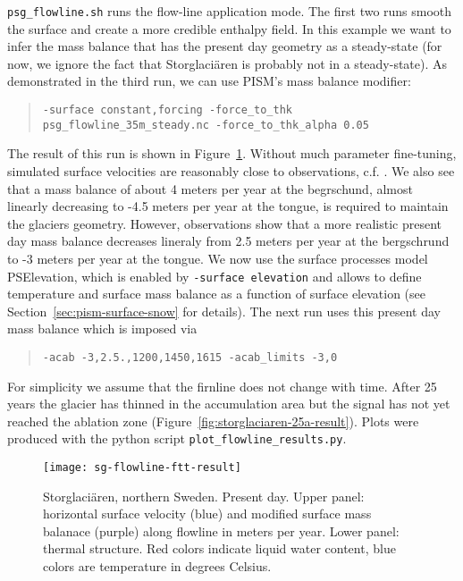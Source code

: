 \texttt{psg_flowline.sh} runs the flow-line application mode. The first two runs smooth the surface and create a more credible enthalpy field. In this example we want to infer the mass balance that has the present day geometry as a steady-state (for now, we ignore the fact that Storglaci{\"a}ren is probably not in a steady-state). As demonstrated in the third run, we can use PISM's mass balance modifier:
\begin{quote}\small
\begin{verbatim}
-surface constant,forcing -force_to_thk psg_flowline_35m_steady.nc -force_to_thk_alpha 0.05
\end{verbatim}
\normalsize\end{quote}
The result of this run is shown in Figure~\ref{fig:storglaciaren-ftt-result}. Without much parameter fine-tuning, simulated surface velocities are reasonably close to observations, c.f. \cite{AschwandenBlatter}.  We also see that a mass balance of about 4 meters per year at the begrschund, almost linearly decreasing to -4.5 meters per year at the tongue, is required to maintain the glaciers geometry. However, observations show that a more realistic present day mass balance decreases lineraly from 2.5 meters per year at the bergschrund to -3 meters per year at the tongue. We now use the surface processes model PSElevation, which is enabled by \texttt{-surface elevation} and allows to define temperature and surface mass balance as a function of surface elevation (see Section~\ref{sec:pism-surface-snow} for details). The next run uses this present day mass balance which is imposed via 
\begin{quote}\small
\begin{verbatim}
-acab -3,2.5.,1200,1450,1615 -acab_limits -3,0
\end{verbatim}
\normalsize\end{quote} 
For simplicity we assume that the firnline does not change with time. After 25 years the glacier has thinned in the accumulation area but the signal has not yet reached the ablation zone (Figure~\ref{fig:storglaciaren-25a-result}). Plots were produced with the python script \texttt{plot_flowline_results.py}.

\begin{figure}[ht]
  \centering
  \texttt{[image: sg-flowline-ftt-result]}
  \caption{Storglaci{\"a}ren, northern Sweden. Present day. Upper panel: horizontal surface velocity (blue) and modified surface mass balanace (purple) along flowline in meters per year. Lower panel: thermal structure. Red colors indicate liquid water content, blue colors are temperature in degrees Celsius.}
  \label{fig:storglaciaren-ftt-result}
\end{figure}

